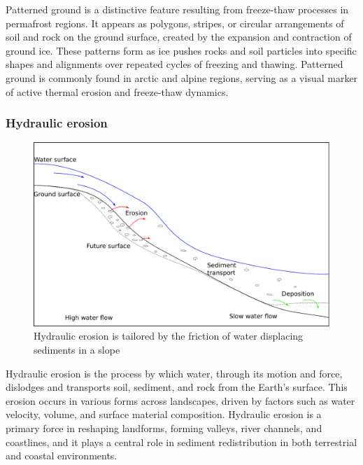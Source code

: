 Patterned ground is a distinctive feature resulting from freeze-thaw processes in permafrost regions. It appears as polygons, stripes, or circular arrangements of soil and rock on the ground surface, created by the expansion and contraction of ground ice. These patterns form as ice pushes rocks and soil particles into specific shapes and alignments over repeated cycles of freezing and thawing. Patterned ground is commonly found in arctic and alpine regions, serving as a visual marker of active thermal erosion and freeze-thaw dynamics.


\subsubsection{Hydraulic erosion}

\begin{figure}
    \includegraphics[width=\linewidth]{hydraulic_erosion.pdf}
    \caption{Hydraulic erosion is tailored by the friction of water displacing sediments in a slope}
    \label{fig:erosion_hydraulic-erosion}
\end{figure}

Hydraulic erosion is the process by which water, through its motion and force, dislodges and transports soil, sediment, and rock from the Earth’s surface. This erosion occurs in various forms across landscapes, driven by factors such as water velocity, volume, and surface material composition. Hydraulic erosion is a primary force in reshaping landforms, forming valleys, river channels, and coastlines, and it plays a central role in sediment redistribution in both terrestrial and coastal environments.

